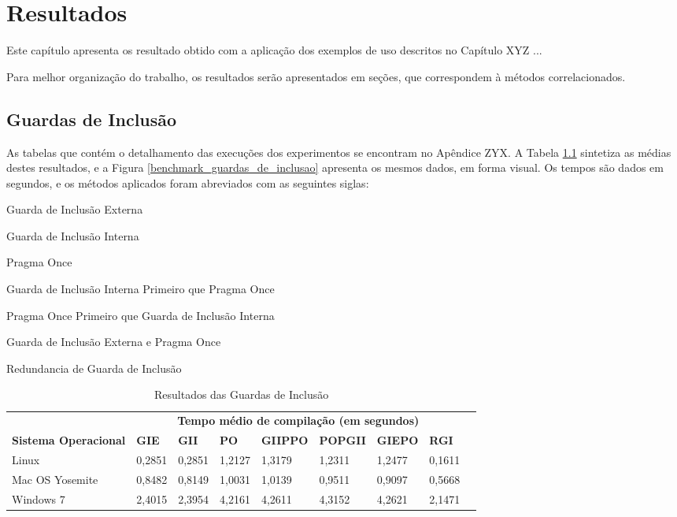\chapter[Resultados]{Resultados}

Este capítulo apresenta os resultado obtido com a aplicação dos exemplos de uso descritos no Capítulo XYZ ...

Para melhor organização do trabalho, os resultados serão apresentados em seções, que correspondem à métodos correlacionados.


\section{Guardas de Inclusão}

As tabelas que contém o detalhamento das execuções dos experimentos se encontram no Apêndice ZYX. A Tabela \ref{tab:resutados_guards_de_inclusao}
sintetiza as médias destes resultados, e a Figura \ref{benchmark_guardas_de_inclusao} apresenta os mesmos dados, em forma
visual. Os tempos são dados em segundos, e os métodos aplicados foram abreviados com as seguintes siglas:

\begin{description}
    \tiny
    \item [GIE:] Guarda de Inclusão Externa
    \item [GII:] Guarda de Inclusão Interna
    \item [PO:]  Pragma Once
    \item [GIIPPO:] Guarda de Inclusão Interna Primeiro que Pragma Once
    \item [POPGII:] Pragma Once Primeiro que Guarda de Inclusão Interna
    \item [GIEPPO:] Guarda de Inclusão Externa e Pragma Once
    \item [RGI:] Redundancia de Guarda de Inclusão
\end{description}

\begin{table}[!ht]
\centering
\caption{Resultados das Guardas de Inclusão}
\label{tab:resutados_guards_de_inclusao}
\begin{tiny}
\begin{tabular}{lp{1cm}p{1cm}p{1cm}p{1cm}p{1cm}p{1cm}p{1cm}p{1cm}}
& \multicolumn{7}{c}{\textbf{Tempo médio de compilação (em segundos)} } \\
\textbf{Sistema Operacional} & \textbf{GIE} & \textbf{GII} & \textbf{PO} &
\textbf{GIIPPO} & \textbf{POPGII} & \textbf{GIEPO} & \textbf{RGI} \\ \toprule
 Linux & 0,2851     & 0,2851  & 1,2127    & 1,3179    & 1,2311  & 1,2477     & 0,1611 \\
 Mac OS Yosemite & 0,8482 & 0,8149 & 1,0031  & 1,0139  & 0,9511  & 0,9097  & 0,5668  \\ 
 Windows 7 & 2,4015 & 2,3954 & 4,2161 & 4,2611 & 4,3152 & 4,2621  & 2,1471 \\
\bottomrule
\end{tabular}
\end{tiny}
\end{table}

